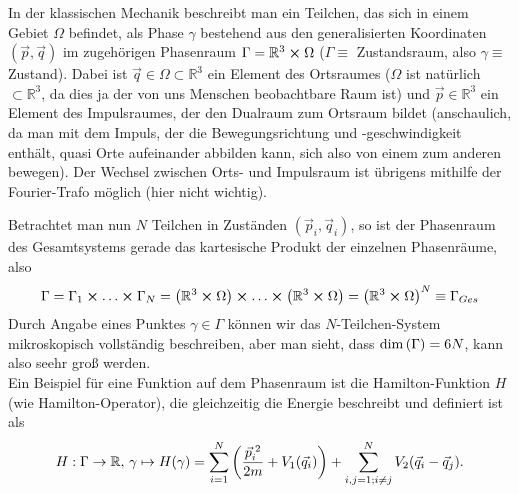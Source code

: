 \documentclass[../KlassMech_main.tex]{subfiles}
\begin{document}
In der klassischen Mechanik beschreibt man ein Teilchen, das sich in einem Gebiet $\Omega$ befindet, als Phase $\gamma$ bestehend aus den generalisierten Koordinaten $(\vec{p}, \vec{q})$ im zugehörigen Phasenraum $\Gamma = \mathbb{R}^3 \cross \Omega$ ($\Gamma\equiv$ Zustandsraum, also $\gamma \equiv$ Zustand). Dabei ist $\vec{q} \in \Omega \subset \mathbb{R}^3$ ein Element des Ortsraumes ($\Omega$ ist natürlich $\subset \mathbb{R}^3$, da dies ja der von uns Menschen beobachtbare Raum ist) und $\vec{p} \in \mathbb{R}^3$ ein Element des Impulsraumes, der den Dualraum zum Ortsraum bildet (anschaulich, da man mit dem Impuls, der die Bewegungsrichtung und -geschwindigkeit enthält, quasi Orte aufeinander abbilden kann, sich also von einem zum anderen bewegen). Der Wechsel zwischen Orts- und Impulsraum ist übrigens mithilfe der Fourier-Trafo möglich (hier nicht wichtig).

Betrachtet man nun $N$ Teilchen in Zuständen $(\vec{p}_i, \vec{q}_i)$, so ist der Phasenraum des Gesamtsystems gerade das kartesische Produkt der einzelnen Phasenräume, also
\begin{equation}\label{key}
\Gamma = \Gamma_1 \cross \dots \cross \Gamma_N = \qty(\mathbb{R}^3 \cross \Omega) \cross \dots \cross \qty(\mathbb{R}^3 \cross \Omega) = \qty(\mathbb{R}^3 \cross \Omega)^N \equiv \Gamma_{Ges}
\end{equation}
Durch Angabe eines Punktes $\gamma \in \Gamma$ können wir das $N$-Teilchen-System mikroskopisch vollständig beschreiben, aber man sieht, dass $\dim\qty(\Gamma) = 6N$, kann also seehr groß werden.\\

Ein Beispiel für eine Funktion auf dem Phasenraum ist die Hamilton-Funktion $H$ (wie Hamilton-Operator), die gleichzeitig die Energie beschreibt und definiert ist als
\begin{align}\label{key}
H: \Gamma \rightarrow \mathbb{R}, \, \gamma \mapsto H(\gamma) = \sum\limits_{i = 1}^N \qty(\frac{\vec{p}^{\;2}_i}{2m} + V_1(\vec{q}_i)) + \sum\limits_{i,j = 1; i \neq j}^N V_2(\vec{q}_i - \vec{q}_j) .
\end{align}

\end{document}
